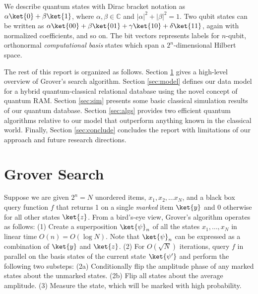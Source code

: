 \documentclass{toc}
\theoremstyle{plain}
\theoremstyle{definition}
\begin{document}
We describe quantum states with
Dirac bracket notation as $\alpha\ket{0} + \beta\ket{1}$,
where $\alpha,\beta \in \mathbb{C}$ and $|\alpha|^2 + |\beta|^2 = 1$.
Two qubit states can be written as
$\alpha\ket{00}+\beta\ket{01}+\gamma\ket{10}+\delta\ket{11}$, again with
normalized coefficients, and so on. The bit vectors represents labels for
$n$-qubit, orthonormal \textit{computational basis} states which span
a $2^n$-dimensional Hilbert space.

The rest of this report is organized as follows.
Section \ref{sec:grover} gives a high-level overview of Grover's
search algorithm.
Section \ref{sec:model}
defines our data model for a hybrid quantum-classical
relational database using the novel concept of quantum RAM.
Section \ref{sec:sim} presents
some basic classical simulation results of our quantum database.
Section \ref{sec:algs} provides two
efficient quantum algorithms relative to our model that outperform
anything known in the classical world.
Finally, Section \ref{sec:conclude} concludes the report with limitations
of our approach and future research directions.

\section{Grover Search}
\label{sec:grover}

Suppose we are given $2^n = N$ unordered items, $x_1, x_2, \ldots x_N$,
and a black box query function $f$ that returns 1 on a single \textit{marked}
item $\ket{y}$ and 0 otherwise for all other states $\ket{z}$.
From a bird's-eye view, Grover's algorithm operates as follows:
(1) Create a superposition $\ket{\psi}_n$ of all the states $x_1, \ldots, x_N$
in linear time $O(n) = O(\log{N})$. Note that $\ket{\psi}_n$ can be expressed
as a combination of $\ket{y}$ and $\ket{z}$.
(2) For $O(\sqrt{N})$ iterations, query $f$ in parallel on the basis
   states of the current state $\ket{\psi'}$ and perform the following two
   substeps:
(2a) Conditionally flip the amplitude phase of any marked states about
     the unmarked states.
(2b) Flip all states about the average amplitude.
(3) Measure the state, which will be marked with high probability.
\end{document}
